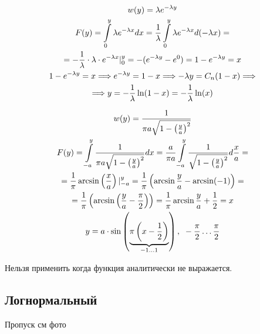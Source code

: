 \documentclass[14pt,a4paper,oneside]{extarticle}
\begin{document}
\begin{gather*}
    w(y)=\lambda e^{-\lambda y}\\
    F(y)=\int\displaylimits_{0}^{y}\lambda e^{-\lambda x}dx=\frac{1}{\lambda}\int\displaylimits_{0}^{y}\lambda e^{-\lambda x}d(-\lambda x)=\\
    =-\frac{1}{\lambda}\cdot\lambda\cdot e^{-\lambda x}|_0^y=-(e^{-\lambda y}-e^0)=1-e^{-\lambda y}=x \\
    1-e^{-\lambda y}=x\Longrightarrow e^{-\lambda y}=1-x\Longrightarrow -\lambda y= C_n(1-x)\Longrightarrow\\
    \Longrightarrow y=-\frac{1}{\lambda}\ln(1-x)=-\frac{1}{\lambda}\ln(x)
\end{gather*}

\begin{gather*}
    w(y)=\frac{1}{\pi a\sqrt{1-\left(\frac{y}{a}\right)^2 }}\\
    F(y)=\int\displaylimits_{-a}^{y}\frac{1}{\pi a\sqrt{1-\left(\frac{y}{a}\right)^2 }}dx=\frac{a}{\pi a}\int\displaylimits_{-a}^{y}\frac{1}{\sqrt{1-\left(\frac{y}{a}\right)^2 }}d\frac{x}{a}=\\
    =\frac{1}{\pi}\arcsin\left(\frac{x}{a}\right)|_{-a}^{y}=\frac{1}{\pi}\left(\arcsin\frac{y}{a}-\arcsin(-1)\right)=\\
    =\frac{1}{\pi}\left(\arcsin\left(\frac{y}{a}-\frac{\pi}{2}\right)\right)=\frac{1}{\pi}\arcsin\frac{y}{a}+\frac{1}{2}=x\\
    y=a\cdot\sin\left(\underbrace{\pi\left(x-\frac{1}{2}\right) }_{-1\ldots1} \right),\text{ } -\frac{\pi}{2}\ldots\frac{\pi}{2}
\end{gather*}

Нельзя применить когда функция аналитически не выражается.

\subsection{Логнормальный}

Пропуск см фото
\end{document}
